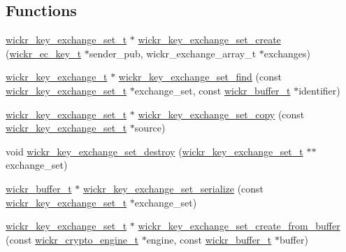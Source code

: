 \subsection*{Functions}
\begin{DoxyCompactItemize}
\item 
\mbox{\hyperlink{structwickr__key__exchange__set}{wickr\+\_\+key\+\_\+exchange\+\_\+set\+\_\+t}} $\ast$ \mbox{\hyperlink{group__wickr__key__exchange__set_ga9d247f82fda4d9ad7cb6784cd591c90e}{wickr\+\_\+key\+\_\+exchange\+\_\+set\+\_\+create}} (\mbox{\hyperlink{structwickr__ec__key}{wickr\+\_\+ec\+\_\+key\+\_\+t}} $\ast$sender\+\_\+pub, wickr\+\_\+exchange\+\_\+array\+\_\+t $\ast$exchanges)
\item 
\mbox{\hyperlink{structwickr__key__exchange}{wickr\+\_\+key\+\_\+exchange\+\_\+t}} $\ast$ \mbox{\hyperlink{group__wickr__key__exchange__set_gae071583943c5c6abe8acc4bcfba032ba}{wickr\+\_\+key\+\_\+exchange\+\_\+set\+\_\+find}} (const \mbox{\hyperlink{structwickr__key__exchange__set}{wickr\+\_\+key\+\_\+exchange\+\_\+set\+\_\+t}} $\ast$exchange\+\_\+set, const \mbox{\hyperlink{structwickr__buffer}{wickr\+\_\+buffer\+\_\+t}} $\ast$identifier)
\item 
\mbox{\hyperlink{structwickr__key__exchange__set}{wickr\+\_\+key\+\_\+exchange\+\_\+set\+\_\+t}} $\ast$ \mbox{\hyperlink{group__wickr__key__exchange__set_ga102baafda8804a97acc5e2a5bc6f7dba}{wickr\+\_\+key\+\_\+exchange\+\_\+set\+\_\+copy}} (const \mbox{\hyperlink{structwickr__key__exchange__set}{wickr\+\_\+key\+\_\+exchange\+\_\+set\+\_\+t}} $\ast$source)
\item 
void \mbox{\hyperlink{group__wickr__key__exchange__set_gadaff24901ec60f83216c03c13bff3e2f}{wickr\+\_\+key\+\_\+exchange\+\_\+set\+\_\+destroy}} (\mbox{\hyperlink{structwickr__key__exchange__set}{wickr\+\_\+key\+\_\+exchange\+\_\+set\+\_\+t}} $\ast$$\ast$exchange\+\_\+set)
\item 
\mbox{\hyperlink{structwickr__buffer}{wickr\+\_\+buffer\+\_\+t}} $\ast$ \mbox{\hyperlink{group__wickr__key__exchange__set_gaf31dcf7493d3eccd4b31b0ff2a79f536}{wickr\+\_\+key\+\_\+exchange\+\_\+set\+\_\+serialize}} (const \mbox{\hyperlink{structwickr__key__exchange__set}{wickr\+\_\+key\+\_\+exchange\+\_\+set\+\_\+t}} $\ast$exchange\+\_\+set)
\item 
\mbox{\hyperlink{structwickr__key__exchange__set}{wickr\+\_\+key\+\_\+exchange\+\_\+set\+\_\+t}} $\ast$ \mbox{\hyperlink{group__wickr__key__exchange__set_gaec93a83e2f00a707caf371b340591324}{wickr\+\_\+key\+\_\+exchange\+\_\+set\+\_\+create\+\_\+from\+\_\+buffer}} (const \mbox{\hyperlink{structwickr__crypto__engine}{wickr\+\_\+crypto\+\_\+engine\+\_\+t}} $\ast$engine, const \mbox{\hyperlink{structwickr__buffer}{wickr\+\_\+buffer\+\_\+t}} $\ast$buffer)
$$
\end{DoxyCompactItemize}

